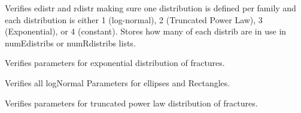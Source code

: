 \documentclass[letterpaper,10pt,english]{sphinxmanual}
\begin{document}
\begin{fulllineitems}
\begin{fulllineitems}
\end{fulllineitems}


\begin{fulllineitems}
\label{\detokenize{pydfnworks:pydfnworks.distributions.distr.distr}}
Verifies \sphinxquotedblleft{}edistr\sphinxquotedblright{} and \sphinxquotedblleft{}rdistr\sphinxquotedblright{} making sure one distribution is defined per family and
each distribution is either 1 (log-normal), 2 (Truncated Power Law), 3 (Exponential), or 4 (constant).
Stores how many of each distrib are in use in numEdistribs or numRdistribs lists.

\end{fulllineitems}


\begin{fulllineitems}
\label{\detokenize{pydfnworks:pydfnworks.distributions.distr.exponential_dist}}
Verifies parameters for exponential distribution of fractures.

\end{fulllineitems}


\begin{fulllineitems}
\label{\detokenize{pydfnworks:pydfnworks.distributions.distr.lognormal_dist}}
Verifies all logNormal Parameters for ellipses and Rectangles.

\end{fulllineitems}


\begin{fulllineitems}
\label{\detokenize{pydfnworks:pydfnworks.distributions.distr.tpl_dist}}
Verifies parameters for truncated power law distribution of fractures.

\end{fulllineitems}


\end{fulllineitems}
\end{document}
